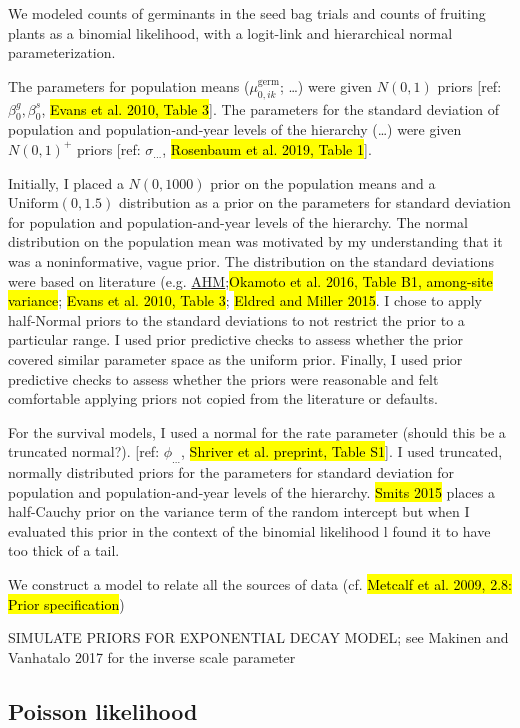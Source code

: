 \documentclass[12pt, oneside, titlepage]{article}   	%
\begin{document}
We modeled counts of germinants in the seed bag trials and counts of fruiting plants as a binomial likelihood, with a logit-link and hierarchical normal parameterization. 

The parameters for population means ($\mu_{0,ik}^\mathrm{germ}$; \dots) were given $N(0,1)$ priors [ref: $\beta_0^g, \beta_0^s$, \hl{Evans et al. 2010, Table 3}]. The parameters for the standard deviation of population and population-and-year levels of the hierarchy (\dots) were given $N(0,1)^+$ priors [ref: $\sigma_{\dots}$, \hl{Rosenbaum et al. 2019, Table 1}]. 

Initially, I placed a $N(0,1000)$ prior on the population means and a $\mathrm{Uniform}(0,1.5)$ distribution as a prior on the parameters for standard deviation for population and population-and-year levels of the hierarchy. The normal distribution on the population mean was motivated by my understanding that it was a noninformative, vague prior. The distribution on the standard deviations were based on literature (e.g.  \href{www.mbr-pwrc.usgs.gov/pubanalysis/keryroylebook/R_BUGS_code_AHM_Vol_1_20170519.R}{AHM};\hl{Okamoto et al. 2016, Table B1, among-site variance}; \hl{Evans et al. 2010, Table 3}; \hl{Eldred and Miller 2015}. I chose to apply half-Normal priors to the standard deviations to not restrict the prior to a particular range. I used prior predictive checks to assess whether the prior covered similar parameter space as the uniform prior. Finally, I used prior predictive checks to assess whether the priors were reasonable and felt comfortable applying priors not copied from the literature or defaults. 


For the survival models, I used a normal for the rate parameter (should this be a truncated normal?). [ref: $\phi_{\dots}$, \hl{Shriver et al. preprint, Table S1}]. I used truncated, normally distributed priors for the parameters for standard deviation for population and population-and-year levels of the hierarchy. \hl{Smits 2015} places a half-Cauchy prior on the variance term of the random intercept but when I evaluated this prior in the context of the binomial likelihood l found it to have too thick of a tail.

We construct a model to relate all the sources of data (cf. \hl{Metcalf et al. 2009, 2.8: Prior specification})

SIMULATE PRIORS FOR EXPONENTIAL DECAY MODEL; see Makinen and Vanhatalo 2017 for the inverse scale parameter


\subsection*{Poisson likelihood}
\end{document}
